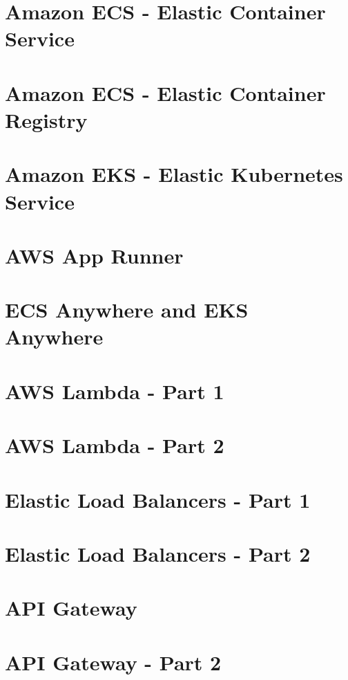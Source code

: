 \documentclass[11pt]{book}
\begin{document}
    \section{Amazon ECS - Elastic Container Service}


    \section{Amazon ECS - Elastic Container Registry}


    \section{Amazon EKS - Elastic Kubernetes Service}


    \section{AWS App Runner}


    \section{ECS Anywhere and EKS Anywhere}


    \section{AWS Lambda - Part 1}


    \section{AWS Lambda - Part 2}


    \section{Elastic Load Balancers - Part 1}


    \section{Elastic Load Balancers - Part 2}


    \section{API Gateway}


    \section{API Gateway - Part 2}
\end{document}
